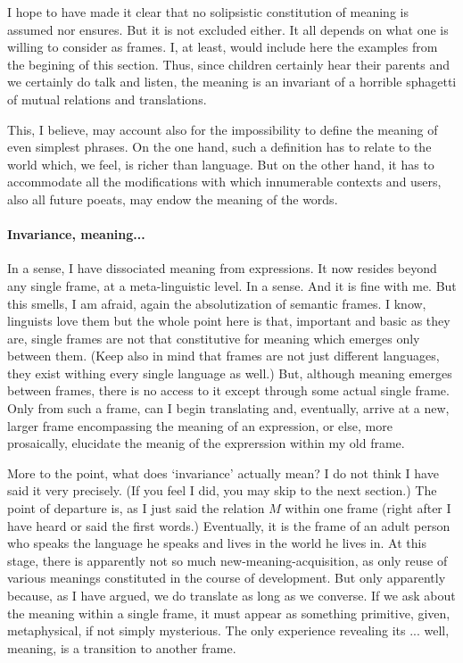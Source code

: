 \documentclass[10pt]{article}
\newcommand{\<}{\langle}
\renewcommand{\>}{\rangle}
\newcommand{\wo}[1]{`#1'}
\begin{document}
I hope to have made it clear that no solipsistic constitution of meaning 
is assumed nor ensures. But it is not excluded either. It all depends on 
what one is willing to consider as frames. I, at least, would include here 
the examples from the begining of this section. Thus, since children 
certainly hear their parents and we certainly do talk and listen, the 
meaning is an invariant of a horrible sphagetti of mutual relations and 
translations. 

This, I believe, may account 
also for the impossibility to define the meaning of even simplest phrases. 
On the one hand, such a definition has to relate to the world which, we feel, is richer 
than language. But on the other hand, it has to accommodate all the 
modifications with which innumerable contexts and users, also all future poeats,
may  endow the meaning of the words.



\paragraph{Invariance, meaning...}
In a sense, I have dissociated meaning from expressions. It now resides 
beyond any single frame, at a meta-linguistic level. In a sense. And it is 
fine with me. But this smells, I am afraid, again the absolutization of semantic 
frames. I know, linguists love them but the whole point here is that, 
important and basic as they are, single frames are not that constitutive for 
meaning which emerges only between them. 
(Keep also in mind that frames are not just different languages, 
they exist withing every single language as well.) 
But, although meaning emerges between frames, there is 
no access to it except through some actual single frame. Only 
from such a frame, can I begin translating and, eventually, arrive 
at a new, larger frame encompassing the meaning of an expression, or else, 
more prosaically, elucidate the meanig of the exprerssion within my old 
frame.

More to the point, what does \wo{invariance} actually mean? I do not think 
I have said it very precisely. (If you feel I did, you may skip to the next 
section.) The point of departure is, as I just said the relation $M$ within 
one frame (right after I have heard or said the first words.) Eventually, 
it is the frame of an adult person who speaks the language he speaks and 
lives in the world he lives in. At this stage, there is apparently not so much 
new-meaning-acquisition, as only reuse of various meanings constituted in the 
course of development. But only apparently because, as I have argued, we 
do translate as long as we converse. If we ask about the meaning within a 
single frame, it must appear as something primitive, given, metaphysical, 
if not simply mysterious. The only experience revealing its ... well, 
meaning, is a transition to another frame. 
\end{document}
